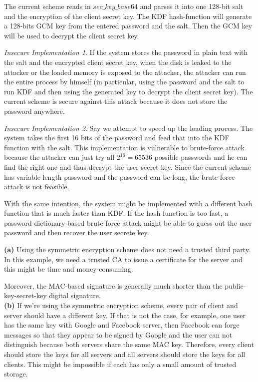 \documentclass[12pt]{article}
\newenvironment{question}[2][Question]{\begin{trivlist}
\item[\hskip \labelsep {\bfseries #1}\hskip \labelsep {\bfseries #2.}]}{\end{trivlist}}
\begin{document}
\begin{question}{3} 
The current scheme reads in $sec\_key\_base64$ and parses it into one 128-bit salt and the encryption of the client secret key. The KDF hash-function will generate a 128-bits GCM key from the entered password and the salt. Then the GCM key will be used to decrypt the client secret key.

\emph{Insecure Implementation 1}. If the system stores the password in plain text with the salt and the encrypted client secret key, when the disk is leaked to the attacker or the loaded memory is exposed to the attacker, the attacker can run the entire process by himself (in particular, using the password and the salt to run KDF and then using the generated key to decrypt the client secret key). The current scheme is secure against this attack because it does not store the password anywhere.

\emph{Insecure Implementation 2}. Say we attempt to speed up the loading process. The system takes the first 16 bits of the password and feed that into the KDF function with the salt. This implementation is vulnerable to brute-force attack because the attacker can just try all $2^{16} = 65536$ possible passwords and he can find the right one and thus decrypt the user secret key. Since the current scheme has variable length password and the password can be long, the brute-force attack is not feasible.

With the same intention, the system might be implemented with a different hash function that is much faster than KDF. If the hash function is too fast, a password-dictionary-based brute-force attack might be able to guess out the user password and then recover the user secrete key.
\end{question}

\newpage

\begin{question}{4}
{\bf (a)} Using the symmetric encryption scheme does not need a trusted third party. In this example, we need a trusted CA to issue a certificate for the server and this might be time and money-consuming.

Moreover, the MAC-based signature is generally much shorter than the public-key-secret-key digital signature. 
\\[5pt] 
{\bf (b)} If we're using the symmetric encryption scheme, every pair of client and server should have a different key. If that is not the case, for example, one user has the same key with Google and Facebook server, then Facebook can forge messages so that they appear to be signed by Google and the user can not distinguish because both servers share the same MAC key. Therefore, every client should store the keys for all servers and all servers should store the keys for all clients. This might be impossible if each has only a small amount of trusted storage.
\end{question}
\end{document}
